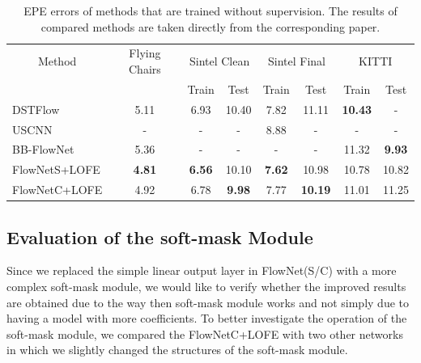 \documentclass[10pt,twocolumn,letterpaper]{article}
\begin{document}
\begin{table}[]
\centering
\caption{EPE errors of methods that are trained without supervision. The results of compared methods are taken directly from the corresponding paper.}
\label{tab: results unsupervised}
\begin{tabular}{lccccccc}
\hline
\hline
\multicolumn{1}{c}{Method} & Flying Chairs & \multicolumn{2}{c}{Sintel Clean} & \multicolumn{2}{c}{Sintel Final} & \multicolumn{2}{c}{KITTI}      \\
                           &               & Train           & Test           & Train          & Test            & Train          & Test          \\ \hline
DSTFlow                    & 5.11          & 6.93            & 10.40          & 7.82           & 11.11           & \textbf{10.43} & -             \\
USCNN                      & -             & -               & -              & 8.88           & -               & -              & -             \\
BB-FlowNet                 & 5.36          & -               & -              & -              & -               & 11.32          & \textbf{9.93} \\
FlowNetS+LOFE              & \textbf{4.81} & \textbf{6.56}   & 10.10          & \textbf{7.62}  & 10.98           & 10.78          & 10.82         \\
FlowNetC+LOFE              & 4.92          & 6.78            & \textbf{9.98}  & 7.77           & \textbf{10.19}  & 11.01          & 11.25         \\ \hline
\end{tabular}
\end{table}

\subsection{Evaluation of the soft-mask Module}
Since we replaced the simple linear output layer in FlowNet(S/C) with a more complex soft-mask module, we would like to verify whether the improved results are obtained due to the way then soft-mask module works and not simply due to having a model with more coefficients. To better investigate the operation of the soft-mask module, we compared the FlowNetC+LOFE with two other networks in which we slightly changed the structures of the soft-mask module.
\end{document}
